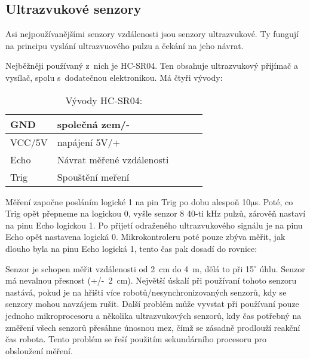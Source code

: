 \subsection{Ultrazvukové senzory}

Asi nejpoužívanějšími senzory vzdálenosti jsou senzory ultrazvukové.
Ty fungují na principu vyslání ultrazvuového pulzu a čekání na jeho návrat.

Nejběžněji používaný z~nich je HC-SR04\cite{hc-sr04}. 
Ten obsahuje ultrazvukový přijímač a vysílač, spolu s~dodatečnou elektronikou.
Má čtyři vývody: 
\begin{table}[h]
	
	\centering
	\begin{tabular}{|l|l|l|l|l|} \hline
		GND & společná zem/-   \\ \hline
		VCC/5V & napájení 5V/+  \\ \hline
		Echo & Návrat měřené vzdálenosti   \\ \hline
		Trig & Spouštění meření \\ \hline
    \end{tabular}
    \caption{Vývody HC-SR04:}
\end{table}

Měření započne posláním logické 1 na pin Trig po dobu alespoň 10$\mathrm{\mu}$s.
Poté, co Trig opět přepneme na logickou 0, vyšle senzor 8 40-ti kHz pulzů, zárověň nastaví na pinu Echo logickou 1.
Po přijetí odraženého ultrazvukového signálu je na pinu Echo opět nastavena logická 0.
Mikrokontroleru poté pouze zbýva měřit, jak dlouho byla na pinu Echo logická 1, tento čas pak dosadí do rovnice:
    
    
Senzor je schopen měřit vzdálenosti od 2~cm do 4~m, dělá to při 15$^{\circ}$ úhlu.
Senzor má nevalnou přesnost (+/-~2~cm).
Největší úskalí při používaní tohoto senzoru nastává, pokud je na hřišti více robotů/nesynchronizovaných senzorů, kdy se senzory mohou navzájem rušit.
Další problém může vyvstat při používaní pouze jednoho mikroprocesoru a několika ultrazvukových senzorů, kdy čas potřebný na změření všech senzorů přesáhne únosnou mez, čímž se zásadně prodlouží reakční čas robota.
Tento problém se řeší použitím sekundárního procesoru pro obsloužení měření.


